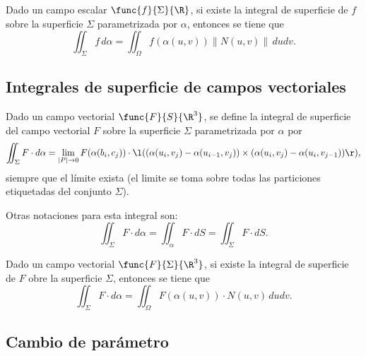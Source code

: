 \documentclass[a4,11pt]{aleph-notas}
\begin{document}
\begin{teo}
    Dado un campo escalar $\func{f}{\Sigma}{\R}$, si existe la integral de superficie de $f$ sobre la superficie $\Sigma$ parametrizada por $\alpha$, entonces se tiene que
    \[
        \iint_\Sigma f\, d\alpha
        =\iint_\Omega f(\alpha(u,v))\|N(u,v)\|\,dudv.
    \]
\end{teo}


\subsection{Integrales de superficie de campos vectoriales}


\begin{defi}
    Dado un campo vectorial $\func{F}{S}{\R^3}$, se define la integral de superficie del campo vectorial $F$ sobre la superficie $\Sigma$ parametrizada por $\alpha$ por
    \[
        \iint_\Sigma F\cdot d\alpha 
        = \lim_{|P|\to 0} F(\alpha(b_i,c_j)) \cdot\l( (\alpha(u_i,v_j)- \alpha(u_{i-1},v_j)) \times (\alpha(u_i,v_j)- \alpha(u_i,v_{j-1}))\r),
    \]
    siempre que el límite exista (el limite se toma sobre todas las particiones etiquetadas del conjunto $\Sigma$).
\end{defi}

\begin{advertencia}
    Otras notaciones para esta integral son:
    \[
        \iint_\Sigma F\cdot d\alpha
        = \iint_\alpha F \cdot dS 
        = \iint_\Sigma F \cdot dS.
    \]
\end{advertencia}

 
\begin{teo}
    Dado un campo vectorial $\func{F}{\Sigma}{\R^3}$, si existe la integral de superficie de $F$ obre la superficie $\Sigma$, entonces se tiene que
    \[
        \iint_\Sigma F\cdot d\alpha
        =\iint_\Omega F(\alpha(u,v))\cdot N(u,v)\,dudv.
    \]
\end{teo}


\subsection{Cambio de parámetro}
\end{document}
